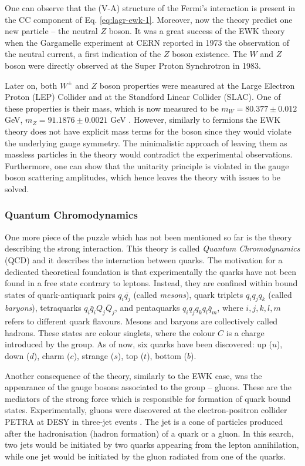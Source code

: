 One can observe that the (V-A) structure of the Fermi's interaction is present in the CC component of Eq. \ref{eq:lagr-ewk-1}. Moreover, now the theory predict one new particle -- the neutral $Z$ boson. It was a great success of the EWK theory when the Gargamelle experiment at CERN reported in 1973 the observation of the neutral current, a first indication of the $Z$ boson existence. The $W$ and $Z$ boson were directly observed at the Super Proton Synchrotron in 1983.   

Later on, both $W^\pm$ and $Z$ boson properties were measured at the Large Electron Proton (LEP) Collider and  at the Standford Linear Collider (SLAC). One of these properties is their mass, which is now measured to be $m_W = 80.377 \pm 0.012$ GeV, $m_Z = 91.1876 \pm 0.0021$ GeV \cite{ParticleDataGroup:2020ssz}. However, similarly to fermions the EWK theory does not have explicit mass terms for the boson since they would violate the underlying gauge symmetry. The minimalistic approach of leaving them as massless particles in the theory would contradict the experimental observations. Furthermore, one can show that the unitarity principle is violated in the gauge boson scattering amplitudes, which hence leaves the theory with issues to be solved.   

\subsubsection{Quantum Chromodynamics}

One more piece of the puzzle which has not been mentioned so far is the theory describing the strong interaction. This theory is called \textit{Quantum Chromodynamics} (QCD) and it describes the interaction between quarks. The motivation for a dedicated theoretical foundation is that experimentally the quarks have not been found in a free state contrary to leptons. Instead, they are confined within bound states of quark-antiquark pairs $q_i\bar{q_j}$ (called \textit{mesons}), quark triplets $q_iq_jq_k$ (called \textit{baryons}), tetraquarks $q_i\bar{q}_iQ_j\bar{Q}_j$, and pentaquarks $q_iq_jq_kq_l\bar{q}_m$, where $i,j,k,l,m$ refers to different quark flavours. Mesons and baryons are collectively called hadrons. These states are colour singlets, where the colour $C$ is a charge introduced by the \suthr group. As of now, six quarks have been discovered: up ($u$), down ($d$), charm ($c$), strange ($s$), top ($t$), bottom ($b$).

Another consequence of the theory, similarly to the EWK case, was the appearance of the gauge bosons associated to the group -- gluons. These are the mediators of the strong force which is responsible for formation of quark bound states. Experimentally, gluons were discovered at the electron-positron collider PETRA at DESY in three-jet events \cite{Barber:1979yr}. The jet is a cone of particles produced after the hadronisation (hadron formation) of a quark or a gluon. In this search, two jets would be initiated by two quarks appearing from the lepton annihilation, while one jet would be initiated by the gluon radiated from one of the quarks.  

